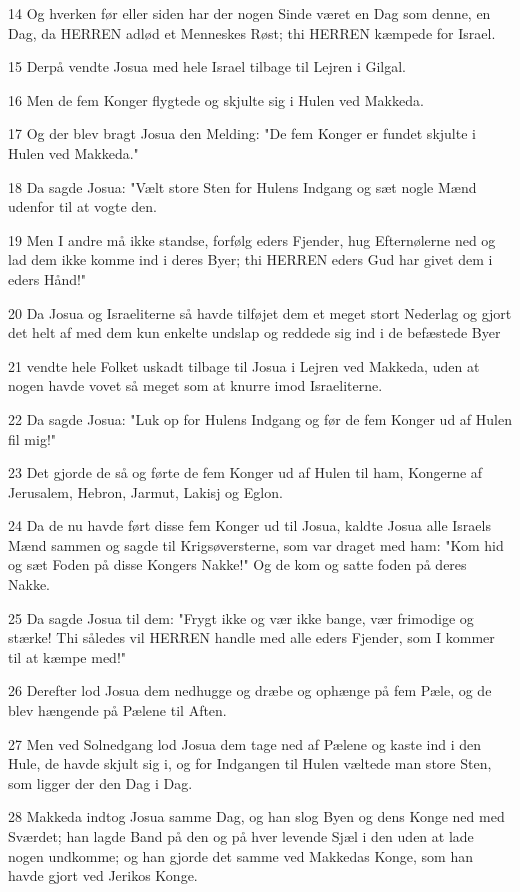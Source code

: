 \par 14 Og hverken før eller siden har der nogen Sinde været en Dag som denne, en Dag, da HERREN adlød et Menneskes Røst; thi HERREN kæmpede for Israel.
\par 15 Derpå vendte Josua med hele Israel tilbage til Lejren i Gilgal.
\par 16 Men de fem Konger flygtede og skjulte sig i Hulen ved Makkeda.
\par 17 Og der blev bragt Josua den Melding: "De fem Konger er fundet skjulte i Hulen ved Makkeda."
\par 18 Da sagde Josua: "Vælt store Sten for Hulens Indgang og sæt nogle Mænd udenfor til at vogte den.
\par 19 Men I andre må ikke standse, forfølg eders Fjender, hug Efternølerne ned og lad dem ikke komme ind i deres Byer; thi HERREN eders Gud har givet dem i eders Hånd!"
\par 20 Da Josua og Israeliterne så havde tilføjet dem et meget stort Nederlag og gjort det helt af med dem kun enkelte undslap og reddede sig ind i de befæstede Byer
\par 21 vendte hele Folket uskadt tilbage til Josua i Lejren ved Makkeda, uden at nogen havde vovet så meget som at knurre imod Israeliterne.
\par 22 Da sagde Josua: "Luk op for Hulens Indgang og før de fem Konger ud af Hulen fil mig!"
\par 23 Det gjorde de så og førte de fem Konger ud af Hulen til ham, Kongerne af Jerusalem, Hebron, Jarmut, Lakisj og Eglon.
\par 24 Da de nu havde ført disse fem Konger ud til Josua, kaldte Josua alle Israels Mænd sammen og sagde til Krigsøversterne, som var draget med ham: "Kom hid og sæt Foden på disse Kongers Nakke!" Og de kom og satte foden på deres Nakke.
\par 25 Da sagde Josua til dem: "Frygt ikke og vær ikke bange, vær frimodige og stærke! Thi således vil HERREN handle med alle eders Fjender, som I kommer til at kæmpe med!"
\par 26 Derefter lod Josua dem nedhugge og dræbe og ophænge på fem Pæle, og de blev hængende på Pælene til Aften.
\par 27 Men ved Solnedgang lod Josua dem tage ned af Pælene og kaste ind i den Hule, de havde skjult sig i, og for Indgangen til Hulen væltede man store Sten, som ligger der den Dag i Dag.
\par 28 Makkeda indtog Josua samme Dag, og han slog Byen og dens Konge ned med Sværdet; han lagde Band på den og på hver levende Sjæl i den uden at lade nogen undkomme; og han gjorde det samme ved Makkedas Konge, som han havde gjort ved Jerikos Konge.
